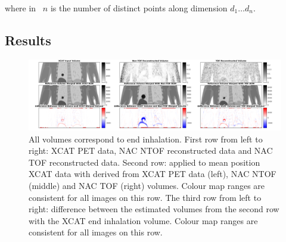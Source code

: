                 \noindent where in~ $n$ is the number of distinct points along dimension $d_1 \dotso d_n$.
            
        \subsection{Results} \label{sec:impact_of_tof_on_respiratory_motion_model_estimation_using_pre_gated_no_intra_cycle_motion_nac_pet_results}
            \begin{figure}
                \centering
                
                \includegraphics[width=1.0\linewidth]{figures/motion_correction_results_1_output.png}
                
                \captionsetup{singlelinecheck=false, justification=raggedright}
                \caption{All volumes correspond to end inhalation. First row from left to right: \gls{XCAT} \gls{PET} data, \gls{NAC} \gls{NTOF} reconstructed data and \gls{NAC} \gls{TOF} reconstructed data. Second row:  applied to mean position \gls{XCAT} data with  derived from \gls{XCAT} \gls{PET} data (left), \gls{NAC} \gls{NTOF} (middle) and \gls{NAC} \gls{TOF} (right) volumes. Colour map ranges are consistent for all images on this row. The third row from left to right:  difference between the estimated volumes from the second row with the \gls{XCAT} end inhalation volume. Colour map ranges are consistent for all images on this row.} \label{fig:impact_of_tof_on_respiratory_motion_model_estimation_using_pre_gated_no_intra_cycle_motion_nac_pet_results_output}
            \end{figure}
            
